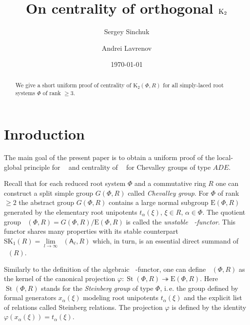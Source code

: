 \documentclass[11pt]{amsart}
\title{On centrality of orthogonal $\Kt$}
\author{Sergey Sinchuk}
\author {Andrei Lavrenov}
\date {\today}
\theoremstyle{plain} \declaretheorem[name=Theorem, Refname={Theorem,Theorems}]{tm} \Crefname{tm}{Theorem}{Theorems}
\numberwithin{equation}{section}
\theoremstyle{definition} \newtheorem{df}[lm]{Definition} \Crefname{df}{Definition}{Definitions}
\theoremstyle{remark} \newtheorem{rk}[lm]{Remark} \Crefname{rk}{Remark}{Remarks}
\newcommand{\E}{{\mathrm{E}}}
\newcommand{\St}{\mathop{\mathrm{St}}\nolimits}
\newcommand{\Kt}{\mathop{\mathrm{K_2}}\nolimits}
\newcommand{\Ko}{\mathop{\mathrm{K_1}}\nolimits}
\newcommand{\rA}{\mathsf{A}}
\begin{document}
\begin{abstract} We give a short uniform proof of centrality of $\mathrm K_2(\Phi, R)$ for all simply-laced root systems $\Phi$ of rank $\geq 3$.
\end{abstract}

\maketitle


\section*{Inroduction}
The main goal of the present paper is to obtain a uniform proof of the local-global principle for $\Kt$ and centrality of $\Kt$ for Chevalley groups of type $ADE$.

Recall that for each reduced root system $\Phi$ and a commutative ring $R$ one can construct a split simple group $G(\Phi, R)$ called \emph{Chevalley group}.
For $\Phi$ of rank $\geq 2$ the abstract group $G(\Phi, R)$ contains a large normal subgroup $\E(\Phi, R)$ generated by the elementary root unipotents $t_\alpha(\xi)$, $\xi\in R$, $\alpha\in \Phi$.
The quotient group $\Ko(\Phi, R)=G(\Phi, R)/\E(\Phi, R)$ is called the \emph{unstable $\Ko$-functor}.
This functor shares many properties with its stable counterpart $\mathrm{SK}_1(R) = \lim\limits_{l\to\infty}\Ko(\rA_\ell, R)$ which, in turn, is an essential direct summand of $\Ko(R)$.

Similarly to the definition of the algebraic $\Kt$-functor, one can define $\Kt(\Phi, R)$ as the kernel of the canonical projection $\varphi\colon\St(\Phi, R)\twoheadrightarrow \E(\Phi, R)$.
Here $\St(\Phi, R)$ stands for the \emph{Steinberg group} of type $\Phi$, i.\,e. the group defined by formal generators $x_\alpha(\xi)$ modeling root unipotents $t_\alpha(\xi)$
and the explicit list of relations called Steinberg relations. The projection $\varphi$ is defined by the identity $\varphi(x_\alpha(\xi))=t_\alpha(\xi)$.
\end{document}
